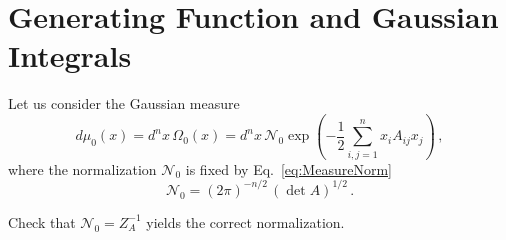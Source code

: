 \documentclass[notes.tex]{subfiles}
\begin{document}
\section{Generating Function and Gaussian Integrals}
\label{sec:gener-funct-gauss}

Let us consider the Gaussian measure
\begin{equation}
  \label{eq:GaussMeas}
  d\mu_0(x) = d^nx\, \Omega_0(x) = d^nx\, \mathcal{N}_0 \exp\left(
    -\frac12 \sum_{i,j=1}^n x_i A_{ij} x_j
    \right)\, ,
\end{equation}
where the normalization $\mathcal{N}_0$ is fixed by Eq.~\ref{eq:MeasureNorm}
\begin{equation}
  \label{eq:GaussNorm}
  \mathcal{N}_0 = \left(2\pi\right)^{-n/2}\, \left( \det A\right)^{1/2}\, .
\end{equation}

\begin{Ex}
  Check that $\mathcal{N}_0=Z_A^{-1}$ yields the correct normalization. 
\end{Ex}
\end{document}
